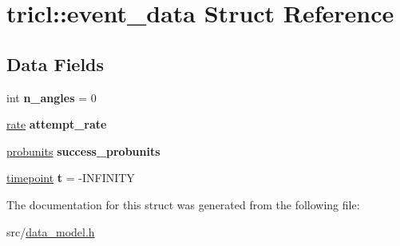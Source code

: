 \hypertarget{structtricl_1_1event__data}{}\section{tricl\+:\+:event\+\_\+data Struct Reference}
\label{structtricl_1_1event__data}
\subsection*{Data Fields}
\begin{DoxyCompactItemize}
\item 
\mbox{\label{structtricl_1_1event__data_a6c10029d49048e80c295b346a5b987f9}} 
int {\bfseries n\+\_\+angles} = 0
\item 
\mbox{\label{structtricl_1_1event__data_ab1a97598f3ac7947b16c785138d754df}} 
\hyperlink{data__model_8h_ae42d2696f294300a43e0f5edf4875479}{rate} {\bfseries attempt\+\_\+rate}
\item 
\mbox{\label{structtricl_1_1event__data_af2cce9d4c534778696f87867c156d076}} 
\hyperlink{data__model_8h_af8f8f9076e92e1c664ffa96f18d038a5}{probunits} {\bfseries success\+\_\+probunits}
\item 
\mbox{\label{structtricl_1_1event__data_acd1cbe2baf952a87e40d96d5ff60ccb6}} 
\hyperlink{data__model_8h_a720ff6a29f998e11e1d3622fc8df64b1}{timepoint} {\bfseries t} = -\/I\+N\+F\+I\+N\+I\+TY
\end{DoxyCompactItemize}


The documentation for this struct was generated from the following file\+:\begin{DoxyCompactItemize}
\item 
src/\hyperlink{data__model_8h}{data\+\_\+model.\+h}\end{DoxyCompactItemize}
